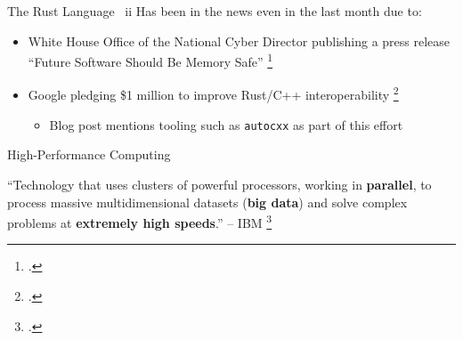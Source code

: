 \documentclass[10pt,aspectratio=169]{beamer}
\begin{document}
\begin{frame}{The Rust Language \ ii}
    Has been in the news even in the last month due to:
    \begin{itemize}
        \item White House Office of the National Cyber Director publishing a press release ``Future Software Should Be Memory Safe'' \footcite{PressReleaseFuture2024}  %
        \item Google pledging \$1 million to improve Rust/C++ interoperability \footcite{ImprovingInteroperabilityRust}  %
        \begin{itemize}
            \item<2-> \alert{Blog post mentions tooling such as \texttt{autocxx} as part of this effort}
        \end{itemize}
    \end{itemize}

    \vspace{0.5cm}
\end{frame}

\begin{frame}{High-Performance Computing}
    \begin{displayquote}
        \vspace{0.2cm}
        ``Technology that uses clusters of powerful processors, working in \textbf{parallel}, to process massive multidimensional datasets (\textbf{big data}) and solve complex problems at \textbf{extremely high speeds}.'' -- IBM \footcite{WhatHPCIntroduction}
    \end{displayquote}
\end{frame}
\end{document}
